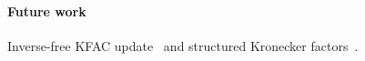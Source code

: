 \paragraph{Future work}
Inverse-free KFAC update~\citep{lin2023simplifying} and structured Kronecker factors~\citep{lin2023structured}.

